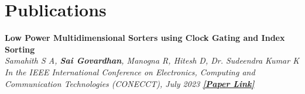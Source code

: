 \section{\sc Publications}

{\bf{Low Power Multidimensional Sorters using Clock Gating and Index Sorting}} \\
\textit{Samahith S A, {\bf{Sai Govardhan}}, Manogna R, Hitesh D, Dr. Sudeendra Kumar K \\
  In the IEEE International Conference on Electronics, Computing and Communication Technologies (CONECCT), July 2023 
  {\bf \href{https://ieeexplore.ieee.org/document/10234758}{[Paper Link]}}}

\endinput
